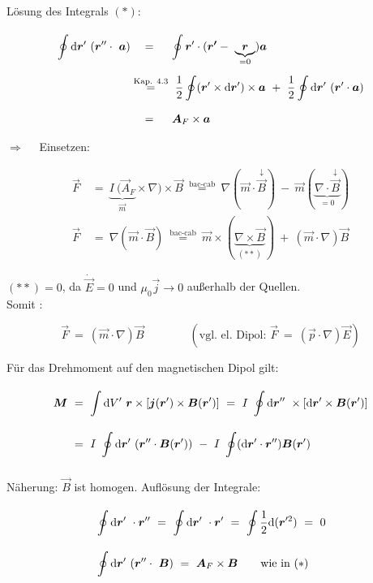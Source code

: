 Lösung des Integrals $(*)$:

\begin{align*}
\Oint{}{}{\vec{r}'} (\vec{r}''\cdot \ \vec{a}) & \quad = \quad \ \oint{}{}{\vec{r}'} \cdot (\vec{r'}- \ \underbrace{\vec{r}}_{=0}) \vec{a}\\
& \overset{\text{Kap. 4.3}}{=} \ \frac{1}{2}\oint(\vec{r}'\times\d\vec{r}')\times\vec{a} \ + \ \frac{1}{2}\Oint{}{}{\vec{r}'}(\vec{r}'\cdot\vec{a})\\
& \quad = \quad \ \vec{A}_F \times\vec{a}
\end{align*}

$\Rightarrow\quad$ Einsetzen:

\begin{align*}
\vec{F}  \ &= \ \underbrace{I \ (\vec{A}_F}_{\vec{m}} \times \nabla)\times \vec{B} \ \overset{\text{bac-cab}}{=} \ \nabla(\vec{m}\cdot\overset{\downarrow}{\vec{B}}) \ - \ \vec{m}(\underbrace{\nabla\cdot\overset{\downarrow}{\vec{B}}}_{=0})\\
\vec{F}  \ &= \ \nabla(\vec{m}\cdot\vec{B}) \ \overset{\text{bac-cab}}{=} \ \vec{m} \times (\underbrace{\nabla\times\vec{B}}_{(**)}) \ + \ (\vec{m}\cdot\nabla)\vec{B}
\end{align*}

$(**)=0$, da $\dot{\vec{E}}=0$ und $\mu_0\vec{j}\rightarrow 0$ außerhalb der Quellen.\\
Somit :

\begin{equation*}
\vec{F}  \ = \  (\vec{m}\cdot\nabla) \vec{B} \qquad\qquad (\text{vgl. el. Dipol: } \vec{F}  \ = \ (\vec{p}\cdot\nabla)\vec{E})
\end{equation*}

Für das Drehmoment auf den magnetischen Dipol gilt:

\begin{align*}
\vec{M}  \ &= \ \Int{}{}{V'} \vec{r}\times\left[\vec{j}(\vec{r}') \times \vec{B}(\vec{r}')\right] \ = \  I  \ \Oint{}{}{\vec{r}''} \times \left[\d\vec{r}' \times\vec{B}(\vec{r}')\right]\\
 &= \ I \ \Oint{}{}{\vec{r}'}(\vec{r}''\cdot\vec{B}(\vec{r}')) \ - \ I \ \oint(\d\vec{r}'\cdot\vec{r}'')\vec{B}(\vec{r}')
\end{align*}

Näherung: $\vec{B}$ ist homogen. Auflösung der Integrale:

\begin{align*}
&\Oint{}{}{\vec{r}'} \cdot \vec{r}'' \ = \ \Oint{}{}{\vec{r}'}\cdot\vec{r}'  \ = \ \oint\frac{1}{2}\d(\vec{r}'^2)  \ = \ 0\\
&\Oint{}{}{\vec{r}'} (\vec{r}''\cdot\ \vec{B})  \ = \ \vec{A}_F \times\vec{B} \qquad \text{wie in } (*)
\end{align*}

